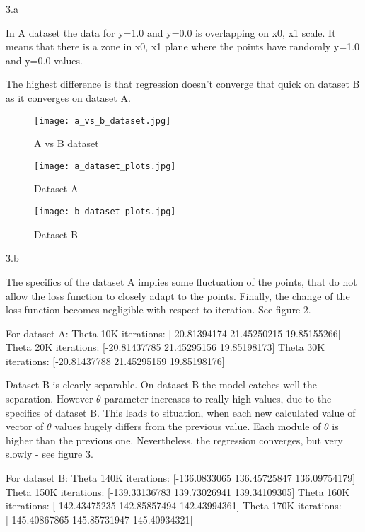 \LARGE
3.a
\normalsize

\begin{answer}
  In A dataset the data for y=1.0 and y=0.0 is overlapping on x0, x1 scale. It means that there is a zone in x0, x1 plane where the points have randomly y=1.0 and y=0.0 values.

  The highest difference is that regression doesn't converge that quick on dataset B as it converges on dataset A.  
\end{answer}
\begin{figure}
  \texttt{[image: a\_vs\_b\_dataset.jpg]}
  \caption{A vs B dataset}
  \label{fig:avsb}
\end{figure}
\begin{figure}
  \texttt{[image: a\_dataset\_plots.jpg]}
  \caption{Dataset A}
  \label{fig:a_dataset}
\end{figure}

\begin{figure}
  \texttt{[image: b\_dataset\_plots.jpg]}
  \caption{Dataset B}
  \label{fig:a_dataset}
\end{figure}

\LARGE
3.b
\normalsize

\begin{answer}
  The specifics of the dataset A implies some fluctuation of the points, that do not allow the loss function to closely adapt to the points. Finally, the change of the loss function becomes negligible with respect to iteration. See figure 2.

  For dataset A:\newline
  Theta 10K iterations: [-20.81394174  21.45250215  19.85155266]\newline
  Theta 20K iterations: [-20.81437785  21.45295156  19.85198173]\newline
  Theta 30K iterations: [-20.81437788  21.45295159  19.85198176]\newline

  Dataset B is clearly separable. On dataset B the model catches well the separation. However $\theta$ parameter increases to really high values, due to the specifics of dataset B. This leads to situation, when each new calculated value of vector of $\theta$ values hugely differs from the previous value. Each module of $\theta$ is higher than the previous one. Nevertheless, the regression converges, but very slowly - see figure 3.

  For dataset B:\newline
  Theta 140K iterations: [-136.0833065   136.45725847  136.09754179]\newline
  Theta 150K iterations: [-139.33136783  139.73026941  139.34109305]\newline
  Theta 160K iterations: [-142.43475235  142.85857494  142.43994361]\newline
  Theta 170K iterations: [-145.40867865  145.85731947  145.40934321]\newline
\end{answer}

